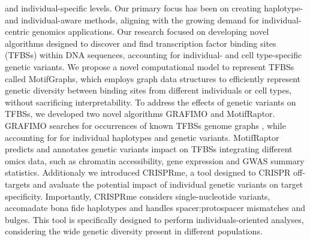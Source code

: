 \documentclass[a4paper, titlepage, openright]{book}
\newcommand{\grafimo}{GRAFIMO\xspace}
\newcommand{\crisprme}{CRISPRme\xspace}
\newcommand{\motifraptor}{MotifRaptor\xspace}
\begin{document}
and individual-specific levels. Our primary focus has been on creating haplotype- and individual-aware methods, aligning with the growing demand for individual-centric genomics applications.  Our research focused on developing novel algorithms designed to discover and find transcription factor binding sites (TFBSs) within DNA sequences, accounting for individual- and cell type-specific genetic variants.  We propose a novel computational model to represent TFBSs called MotifGraphs, which employs graph data structures to efficiently represent genetic diversity between binding sites from different individuals or cell types, without sacrificing interpretability.  To address the effects of genetic variants on TFBSs, we developed two novel algorithms \grafimo \citep{tognon2021grafimo} and \motifraptor \citep{yao2021motif}. \grafimo searches for occurrences of known TFBSs genome graphs \citep{paten2017genome}, while accounting for for individual haplotypes and genetic variants. \motifraptor predicts and annotates genetic variants impact on TFBSs integrating different omics data, such as chromatin accessibility, gene expression and GWAS summary statistics. Additionaly we introduced \crisprme \citep{cancellieri2023human}, a tool designed to CRISPR off-targets and avaluate the potential impact of individual genetic variants on target specificity.  Importantly,  \crisprme considers single-nucleotide variants, accomadate bona fide haplotypes and handles spacer:protospacer mismatches and bulges. This tool is specifically designed to perform individuals-oriented analyses, considering the wide genetic diversity present in different populations.
\end{document}
